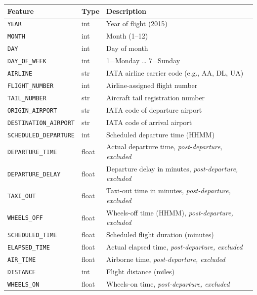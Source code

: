 \documentclass{article}
\newcommand{\code}[1]{\texttt{\small #1}}
\begin{document}
\begin{tcolorbox}[mainbox, title={BTS Feature Descriptions}]
\renewcommand{\arraystretch}{1.3}
\begin{longtable}{L{4cm} L{1.8cm} p{7.5cm}}
    \toprule
    \textbf{Feature} & \textbf{Type} & \textbf{Description} \\
    \midrule
    \endhead
    \code{YEAR}                  & int   & Year of flight (2015) \\
    \code{MONTH}                 & int   & Month (1--12) \\
    \code{DAY}                   & int   & Day of month \\
    \code{DAY\_OF\_WEEK}         & int   & 1=Monday \ldots{} 7=Sunday \\
    \code{AIRLINE}               & str   & IATA airline carrier code (e.g., AA, DL, UA) \\
    \code{FLIGHT\_NUMBER}        & int   & Airline-assigned flight number \\
    \code{TAIL\_NUMBER}          & str   & Aircraft tail registration number \\
    \code{ORIGIN\_AIRPORT}       & str   & IATA code of departure airport \\
    \code{DESTINATION\_AIRPORT}  & str   & IATA code of arrival airport \\
    \code{SCHEDULED\_DEPARTURE}  & int   & Scheduled departure time (HHMM) \\
    \code{DEPARTURE\_TIME}       & float & Actual departure time, \textit{post-departure, excluded} \\
    \code{DEPARTURE\_DELAY}      & float & Departure delay in minutes, \textit{post-departure, excluded} \\
    \code{TAXI\_OUT}             & float & Taxi-out time in minutes, \textit{post-departure, excluded} \\
    \code{WHEELS\_OFF}           & float & Wheels-off time (HHMM), \textit{post-departure, excluded} \\
    \code{SCHEDULED\_TIME}       & float & Scheduled flight duration (minutes) \\
    \code{ELAPSED\_TIME}         & float & Actual elapsed time, \textit{post-departure, excluded} \\
    \code{AIR\_TIME}             & float & Airborne time, \textit{post-departure, excluded} \\
    \code{DISTANCE}              & int   & Flight distance (miles) \\
    \code{WHEELS\_ON}            & float & Wheels-on time, \textit{post-departure, excluded} \\

\end{longtable}
\end{tcolorbox}
\end{document}
